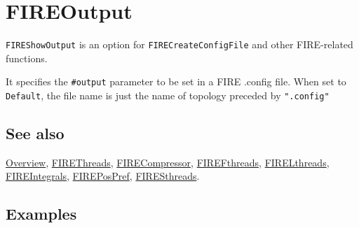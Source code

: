 \documentclass[../FeynHelpersManual.tex]{subfiles}
\begin{document}
\hypertarget{fireoutput}{
\section{FIREOutput}\label{fireoutput}}

\texttt{FIREShowOutput} is an option for \texttt{FIRECreateConfigFile}
and other FIRE-related functions.

It specifies the \texttt{\#{}\allowbreak{}output} parameter to be set in
a FIRE .config file. When set to \texttt{Default}, the file name is just
the name of topology preceded by \texttt{".config"}

\subsection{See also}

\hyperlink{toc}{Overview}, \hyperlink{firethreads}{FIREThreads},
\hyperlink{firecompressor}{FIRECompressor},
\hyperlink{firefthreads}{FIREFthreads},
\hyperlink{firelthreads}{FIRELthreads},
\hyperlink{fireintegrals}{FIREIntegrals},
\hyperlink{firepospref}{FIREPosPref},
\hyperlink{firesthreads}{FIRESthreads}.

\subsection{Examples}
\end{document}

